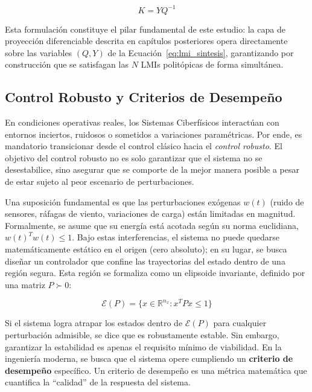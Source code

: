 \begin{equation}
    K = Y Q^{-1}
    \label{eq:recuperacion_K}
\end{equation}

Esta formulación constituye el pilar fundamental de este estudio: la capa de proyección diferenciable descrita en capítulos posteriores opera directamente sobre las variables $(Q,Y)$ de la Ecuación~\eqref{eq:lmi_sintesis}, garantizando por construcción que se satisfagan las $N$ LMIs politópicas de forma simultánea.



\subsection{Control Robusto y Criterios de Desempeño}

En condiciones operativas reales, los Sistemas Ciberfísicos interactúan con entornos inciertos, ruidosos o sometidos a variaciones paramétricas. Por ende, es mandatorio transicionar desde el control clásico hacia el \textit{control robusto}. El objetivo del control robusto no es solo garantizar que el sistema no se desestabilice, sino asegurar que se comporte de la mejor manera posible a pesar de estar sujeto al peor escenario de perturbaciones.

Una suposición fundamental es que las perturbaciones exógenas $w(t)$ (ruido de sensores, ráfagas de viento, variaciones de carga) están limitadas en magnitud. Formalmente, se asume que su energía está acotada según su norma euclidiana, $w(t)^T w(t) \le 1$. Bajo estas interferencias, el sistema no puede quedarse matemáticamente estático en el origen (cero absoluto); en su lugar, se busca diseñar un controlador que confine las trayectorias del estado dentro de una región segura. Esta región se formaliza como un elipsoide invariante, definido por una matriz $P \succ 0$:

\begin{equation}
    \mathcal{E}(P) = \{ x \in \mathbb{R}^{n_x} : x^T P x \le 1 \}
    \label{eq:elipsoide_invariante}
\end{equation}

Si el sistema logra atrapar los estados dentro de $\mathcal{E}(P)$ para cualquier perturbación admisible, se dice que es robustamente estable. Sin embargo, garantizar la estabilidad es apenas el requisito mínimo de viabilidad. En la ingeniería moderna, se busca que el sistema opere cumpliendo un \textbf{criterio de desempeño} específico. Un criterio de desempeño es una métrica matemática que cuantifica la ``calidad'' de la respuesta del sistema. 

